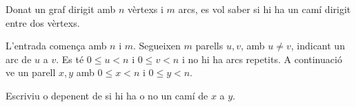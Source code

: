 

\Statement


Donat un graf dirigit amb $n$ vèrtexs i $m$ arcs,
es vol saber si hi ha un camí dirigit entre dos vèrtexs.


\Input

L'entrada comença amb $n$ i $m$.
Segueixen $m$ parells $u,v$, amb $u \ne v$, indicant un arc de $u$ a $v$.
Es té $0\le u<n$ i $0\le v<n$ i no hi ha arcs repetits.
A continuació ve un parell $x,y$
amb  $0\le x<n$ i $0\le y <n$.


\Output


Escriviu  o 
depenent de si hi ha o no un camí de $x$ a $y$.


\Sample

